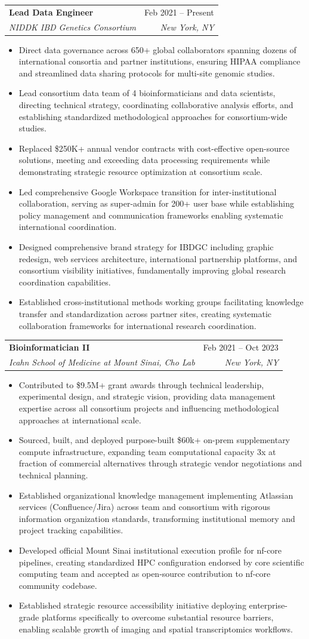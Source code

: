 \documentclass[letterpaper,10pt]{article}
\makeatletter
\newcommand{\resumeItem}[1]{
  \item\small{
    {#1 \vspace{-2pt}}
  }
}
\newcommand{\resumeSubheading}[4]{
  \vspace{-2pt}\item
    \begin{tabular*}{0.97\textwidth}[t]{l@{\extracolsep{\fill}}r}
      \textbf{#1} & #2 \\
      \textit{\small#3} & \textit{\small #4} \\
    \end{tabular*}\vspace{-7pt}
}
\newcommand{\resumeItemListStart}{\begin{itemize}}
\newcommand{\resumeItemListEnd}{\end{itemize}\vspace{-5pt}}
\makeatother
\begin{document}
    \resumeSubheading
      {Lead Data Engineer}{Feb 2021 -- Present}
      {NIDDK IBD Genetics Consortium}{New York, NY}
      \resumeItemListStart
        \resumeItem{Direct data governance across 650+ global collaborators spanning dozens of international consortia and partner institutions, ensuring HIPAA compliance and streamlined data sharing protocols for multi-site genomic studies.}
        \resumeItem{Lead consortium data team of 4 bioinformaticians and data scientists, directing technical strategy, coordinating collaborative analysis efforts, and establishing standardized methodological approaches for consortium-wide studies.}
        \resumeItem{Replaced \$250K+ annual vendor contracts with cost-effective open-source solutions, meeting and exceeding data processing requirements while demonstrating strategic resource optimization at consortium scale.}
        \resumeItem{Led comprehensive Google Workspace transition for inter-institutional collaboration, serving as super-admin for 200+ user base while establishing policy management and communication frameworks enabling systematic international coordination.}
        \resumeItem{Designed comprehensive brand strategy for IBDGC including graphic redesign, web services architecture, international partnership platforms, and consortium visibility initiatives, fundamentally improving global research coordination capabilities.}
        \resumeItem{Established cross-institutional methods working groups facilitating knowledge transfer and standardization across partner sites, creating systematic collaboration frameworks for international research coordination.}
      \resumeItemListEnd

    \resumeSubheading
      {Bioinformatician II}{Feb 2021 -- Oct 2023}
      {Icahn School of Medicine at Mount Sinai, Cho Lab}{New York, NY}
      \resumeItemListStart
        \resumeItem{Contributed to \$9.5M+ grant awards through technical leadership, experimental design, and strategic vision, providing data management expertise across all consortium projects and influencing methodological approaches at international scale.}
        \resumeItem{Sourced, built, and deployed purpose-built \$60k+ on-prem supplementary compute infrastructure, expanding team computational capacity 3x at fraction of commercial alternatives through strategic vendor negotiations and technical planning.}
        \resumeItem{Established organizational knowledge management implementing Atlassian services (Confluence/Jira) across team and consortium with rigorous information organization standards, transforming institutional memory and project tracking capabilities.}
        \resumeItem{Developed official Mount Sinai institutional execution profile for nf-core pipelines, creating standardized HPC configuration endorsed by core scientific computing team and accepted as open-source contribution to nf-core community codebase.}
        \resumeItem{Established strategic resource accessibility initiative deploying enterprise-grade platforms specifically to overcome substantial resource barriers, enabling scalable growth of imaging and spatial transcriptomics workflows.}
      \resumeItemListEnd
\end{document}
